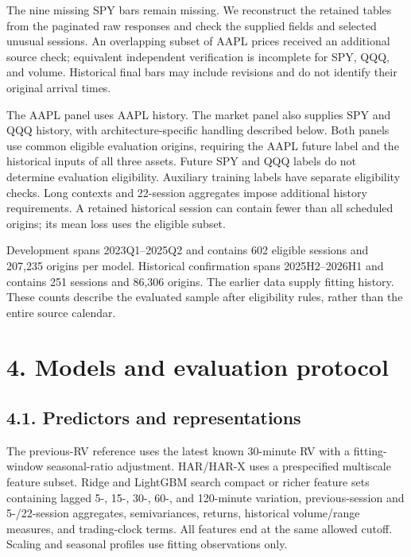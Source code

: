 The nine missing SPY bars remain missing. We reconstruct the retained
tables from the paginated raw responses and check the supplied fields
and selected unusual sessions. An overlapping subset of AAPL prices
received an additional source check; equivalent independent verification
is incomplete for SPY, QQQ, and volume. Historical final bars may
include revisions and do not identify their original arrival times.

The AAPL panel uses AAPL history. The market panel also supplies SPY and
QQQ history, with architecture-specific handling described below. Both
panels use common eligible evaluation origins, requiring the AAPL future
label and the historical inputs of all three assets. Future SPY and QQQ
labels do not determine evaluation eligibility. Auxiliary training
labels have separate eligibility checks. Long contexts and 22-session
aggregates impose additional history requirements. A retained historical
session can contain fewer than all scheduled origins; its mean loss uses
the eligible subset.

Development spans 2023Q1--2025Q2 and contains 602 eligible sessions and
207,235 origins per model. Historical confirmation spans 2025H2--2026H1
and contains 251 sessions and 86,306 origins. The earlier data supply
fitting history. These counts describe the evaluated sample after
eligibility rules, rather than the entire source calendar.

\section{4. Models and evaluation
protocol}\label{models-and-evaluation-protocol}

\subsection{4.1. Predictors and
representations}\label{predictors-and-representations}

The previous-RV reference uses the latest known 30-minute RV with a
fitting-window seasonal-ratio adjustment. HAR/HAR-X uses a prespecified
multiscale feature subset. Ridge and LightGBM search compact or richer
feature sets containing lagged 5-, 15-, 30-, 60-, and 120-minute
variation, previous-session and 5-/22-session aggregates, semivariances,
returns, historical volume/range measures, and trading-clock terms. All
features end at the same allowed cutoff. Scaling and seasonal profiles
use fitting observations only.

